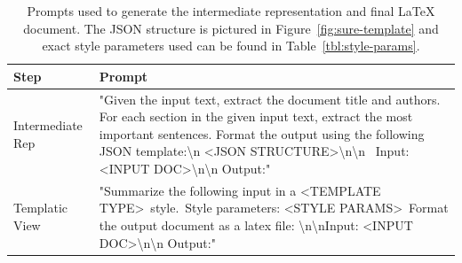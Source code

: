 \begin{table}
\small
\centering
\begin{tabular}{lp{}}
Step & Prompt \\ \hline
Intermediate Rep & "Given the input text, extract the document title and authors. For each section in the given input text, extract the most important sentences. Format the output using the following JSON template:\textbackslash{}n \textless{}JSON STRUCTURE\textgreater \textbackslash{}n\textbackslash{}n ~Input: \textless{}INPUT DOC\textgreater\textbackslash{}n\textbackslash{}n Output:" \\
\hdashline[0.5pt/3pt] 
Templatic View & "Summarize the following input in a \textless{}TEMPLATE TYPE\textgreater ~style.~Style parameters: \textless{}STYLE PARAMS\textgreater~Format the output document as a latex file: \textbackslash{}n\textbackslash{}nInput: \textless{}INPUT DOC\textgreater \textbackslash{}n\textbackslash{}n Output:"
\end{tabular}
    \caption[Prompts used to generate the intermediate representation and final LaTeX document.]{Prompts used to generate the intermediate representation and final LaTeX document. The JSON structure is pictured in Figure~\ref{fig:sure-template} and exact style parameters used can be found in Table~\ref{tbl:style-params}.} %
    \label{tbl:prompts}
\end{table}
